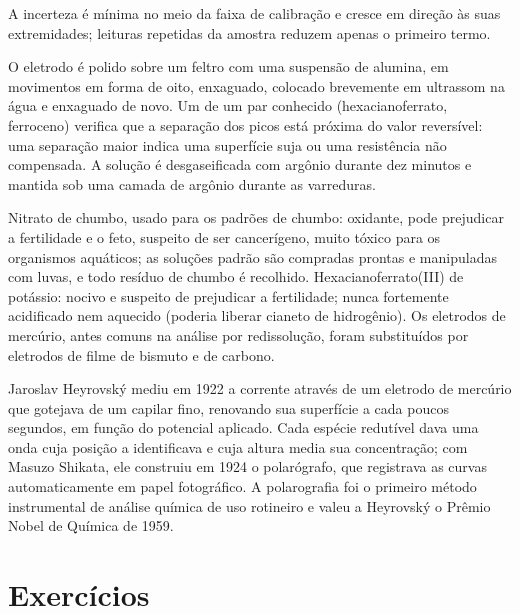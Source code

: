 A incerteza é mínima no meio da faixa de calibração e cresce em direção às suas
extremidades; leituras repetidas da amostra reduzem apenas o primeiro termo.

\begin{inthelab}
O eletrodo é polido sobre um feltro com uma suspensão de alumina, em movimentos
em forma de oito, enxaguado, colocado brevemente em ultrassom na água e enxaguado
de novo. Um  de um par conhecido (hexacianoferrato, ferroceno) verifica
que a separação dos picos está próxima do valor reversível: uma separação maior
indica uma superfície suja ou uma resistência não compensada. A solução é
desgaseificada com argônio durante dez minutos e mantida sob uma camada de
argônio durante as varreduras.
\end{inthelab}

\begin{safety}{}
Nitrato de chumbo, usado para os padrões de chumbo: oxidante, pode prejudicar a
fertilidade e o feto, suspeito de ser cancerígeno, muito tóxico para os organismos
aquáticos; as soluções padrão são compradas prontas e manipuladas com luvas, e todo
resíduo de chumbo é recolhido. Hexacianoferrato(III) de potássio: nocivo e suspeito
de prejudicar a fertilidade; nunca fortemente acidificado nem aquecido (poderia
liberar cianeto de hidrogênio). Os eletrodos de mercúrio, antes comuns na análise
por redissolução, foram substituídos por eletrodos de filme de bismuto e de carbono.
\end{safety}

\begin{history}
Jaroslav Heyrovský mediu em 1922 a corrente através de um eletrodo de mercúrio que
gotejava de um capilar fino, renovando sua superfície a cada poucos segundos, em
função do potencial aplicado. Cada espécie redutível dava uma onda cuja posição a
identificava e cuja altura media sua concentração; com Masuzo Shikata, ele
construiu em 1924 o polarógrafo, que registrava as curvas automaticamente em papel
fotográfico. A polarografia foi o primeiro método instrumental de análise química
de uso rotineiro e valeu a Heyrovský o Prêmio Nobel de Química de 1959.
\end{history}

\section{Exercícios}

